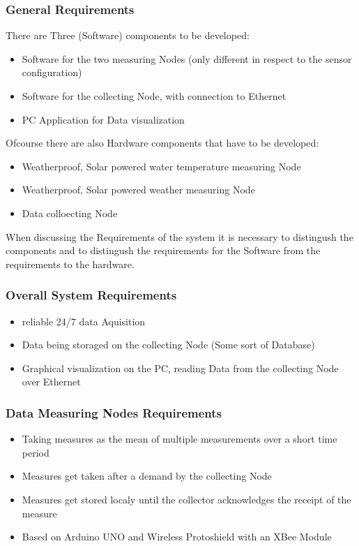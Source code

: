 \documentclass[
	11pt,
	a4paper
]{article}%
\begin{document}
\subsubsection{General Requirements}
There are Three (Software) components to be developed:
\begin{itemize}
\item Software for the two measuring Nodes (only different in respect to the sensor configuration)
\item Software for the collecting Node, with connection to Ethernet
\item PC Application for Data visualization
\end{itemize}
Ofcourse there are also Hardware components that have to be developed:
\begin{itemize}
\item Weatherproof, Solar powered water temperature measuring Node
\item Weatherproof, Solar powered weather measuring Node
\item Data colloecting Node
\end{itemize} 
When discussing the Requirements of the system it is necessary to distingush the components and to distingush the requirements for the Software from the requirements to the hardware.

\subsubsection{Overall System Requirements}
\begin{itemize}
\item reliable 24/7 data Aquisition
\item Data being storaged on the collecting Node (Some sort of Database)
\item Graphical visualization on the PC, reading Data from the collecting Node over Ethernet
\end{itemize}

\subsubsection{Data Measuring Nodes Requirements}
\begin{itemize}
\item Taking measures as the mean of multiple measurements over a short time period
\item Measures get taken after a demand by the collecting Node
\item Measures get stored localy until the collector acknowledges the receipt of the measure
\item Based on Arduino UNO and Wireless Protoshield with an XBee Module
\end{itemize}
\end{document}
